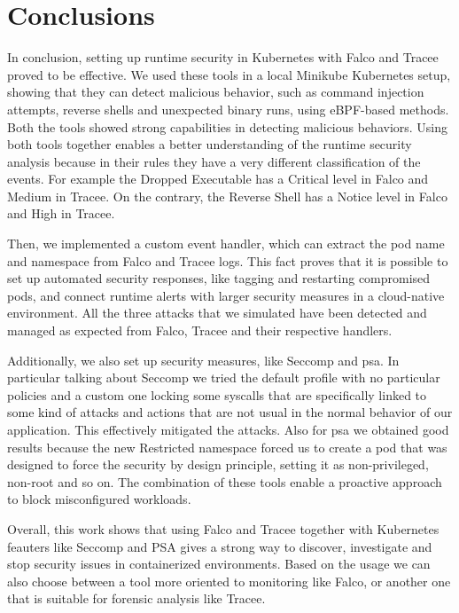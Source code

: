 \section{Conclusions}
\label{sec:concl}

In conclusion, setting up runtime security in Kubernetes with Falco and Tracee proved to be effective. We used these tools in a local Minikube Kubernetes setup, showing that they can detect malicious behavior, such as command injection attempts, reverse shells and unexpected binary runs, using eBPF-based methods. Both the tools showed strong capabilities in detecting malicious behaviors. Using both tools together enables a better understanding of the runtime security analysis because in their rules they have a very different classification of the events. For example the Dropped Executable has a Critical level in Falco and Medium in Tracee. On the contrary, the Reverse Shell has a Notice level in Falco and High in Tracee.

Then, we implemented a custom event handler, which can extract the pod name and namespace from Falco and Tracee logs. This fact proves that it is possible to set up automated security responses, like tagging and restarting compromised pods, and connect runtime alerts with larger security measures in a cloud-native environment. All the three attacks that we simulated have been detected and managed as expected from Falco, Tracee and their respective handlers.

Additionally, we also set up security measures, like Seccomp and \acrlong{psa}. In particular talking about Seccomp we tried the default profile with no particular policies and a custom one locking some syscalls that are specifically linked to some kind of attacks and actions that are not usual in the normal behavior of our application. This effectively mitigated the attacks. Also for \ac{psa} we obtained good results because the new Restricted namespace forced us to create a pod that was designed to force the security by design principle, setting it as non-privileged, non-root and so on. The combination of these tools enable a proactive approach to block misconfigured workloads.

Overall, this work shows that using Falco and Tracee together with Kubernetes feauters like Seccomp and PSA gives a strong way to discover, investigate and stop security issues in containerized environments. Based on the usage we can also choose between a tool more oriented to monitoring like Falco, or another one that is suitable for forensic analysis like Tracee.

